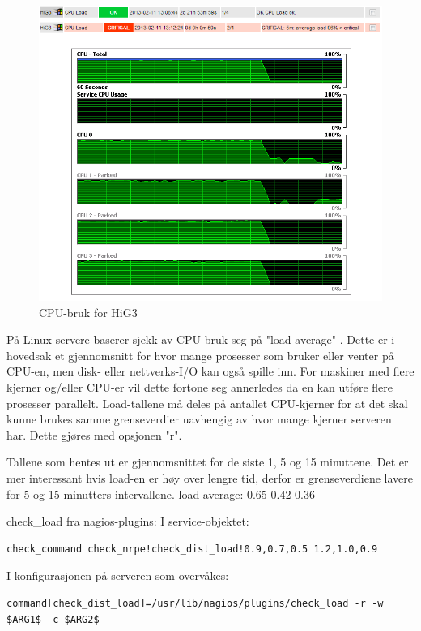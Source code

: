 \begin{figure}[H]
    \centering
    \includegraphics[scale=0.6]{img/cpu_test_hig3}
    \caption{CPU-bruk for HiG3}
    \label{cpustrain}
\end{figure}


På Linux-servere baserer sjekk av CPU-bruk seg på "load-average" \cite{loadavg} \cite{wiki:loadavg}. Dette er i hovedsak et gjennomsnitt for hvor mange prosesser som bruker eller venter på CPU-en, men disk- eller nettverks-I/O kan også spille inn. For maskiner med flere kjerner og/eller CPU-er vil dette fortone seg annerledes da en kan utføre flere prosesser parallelt. Load-tallene må deles på antallet CPU-kjerner for at det skal kunne brukes samme grenseverdier uavhengig av hvor mange kjerner serveren har. Dette gjøres med opsjonen "r".

Tallene som hentes ut er gjennomsnittet for de siste 1, 5 og 15 minuttene. Det er mer interessant hvis load-en er høy over lengre tid, derfor er grenseverdiene lavere for 5 og 15 minutters intervallene.
load average: 0.65 0.42 0.36

check\_load fra nagios-plugins:
I service-objektet:
\begin{lstlisting}
check_command check_nrpe!check_dist_load!0.9,0.7,0.5 1.2,1.0,0.9
\end{lstlisting}
I konfigurasjonen på serveren som overvåkes:
\begin{lstlisting}
command[check_dist_load]=/usr/lib/nagios/plugins/check_load -r -w $ARG1$ -c $ARG2$
\end{lstlisting}

